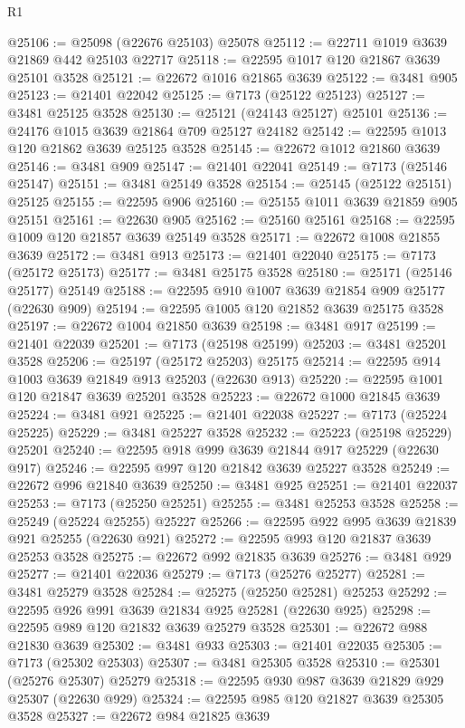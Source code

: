 \begin{lexlean}{R1}
\begin{coremodule}
@25106 := @25098 (@22676 @25103) @25078
@25112 := @22711 @1019 @3639 @21869 @442 @25103 @22717
@25118 := @22595 @1017 @120 @21867 @3639 @25101 @3528
@25121 := @22672 @1016 @21865 @3639
@25122 := @3481 @905
@25123 := @21401 @22042
@25125 := @7173 (@25122 @25123)
@25127 := @3481 @25125 @3528
@25130 := @25121 (@24143 @25127) @25101
@25136 := @24176 @1015 @3639 @21864 @709 @25127 @24182
@25142 := @22595 @1013 @120 @21862 @3639 @25125 @3528
@25145 := @22672 @1012 @21860 @3639
@25146 := @3481 @909
@25147 := @21401 @22041
@25149 := @7173 (@25146 @25147)
@25151 := @3481 @25149 @3528
@25154 := @25145 (@25122 @25151) @25125
@25155 := @22595 @906
@25160 := @25155 @1011 @3639 @21859 @905 @25151
@25161 := @22630 @905
@25162 := @25160 @25161
@25168 := @22595 @1009 @120 @21857 @3639 @25149 @3528
@25171 := @22672 @1008 @21855 @3639
@25172 := @3481 @913
@25173 := @21401 @22040
@25175 := @7173 (@25172 @25173)
@25177 := @3481 @25175 @3528
@25180 := @25171 (@25146 @25177) @25149
@25188 := @22595 @910 @1007 @3639 @21854 @909 @25177 (@22630 @909)
@25194 := @22595 @1005 @120 @21852 @3639 @25175 @3528
@25197 := @22672 @1004 @21850 @3639
@25198 := @3481 @917
@25199 := @21401 @22039
@25201 := @7173 (@25198 @25199)
@25203 := @3481 @25201 @3528
@25206 := @25197 (@25172 @25203) @25175
@25214 := @22595 @914 @1003 @3639 @21849 @913 @25203 (@22630 @913)
@25220 := @22595 @1001 @120 @21847 @3639 @25201 @3528
@25223 := @22672 @1000 @21845 @3639
@25224 := @3481 @921
@25225 := @21401 @22038
@25227 := @7173 (@25224 @25225)
@25229 := @3481 @25227 @3528
@25232 := @25223 (@25198 @25229) @25201
@25240 := @22595 @918 @999 @3639 @21844 @917 @25229 (@22630 @917)
@25246 := @22595 @997 @120 @21842 @3639 @25227 @3528
@25249 := @22672 @996 @21840 @3639
@25250 := @3481 @925
@25251 := @21401 @22037
@25253 := @7173 (@25250 @25251)
@25255 := @3481 @25253 @3528
@25258 := @25249 (@25224 @25255) @25227
@25266 := @22595 @922 @995 @3639 @21839 @921 @25255 (@22630 @921)
@25272 := @22595 @993 @120 @21837 @3639 @25253 @3528
@25275 := @22672 @992 @21835 @3639
@25276 := @3481 @929
@25277 := @21401 @22036
@25279 := @7173 (@25276 @25277)
@25281 := @3481 @25279 @3528
@25284 := @25275 (@25250 @25281) @25253
@25292 := @22595 @926 @991 @3639 @21834 @925 @25281 (@22630 @925)
@25298 := @22595 @989 @120 @21832 @3639 @25279 @3528
@25301 := @22672 @988 @21830 @3639
@25302 := @3481 @933
@25303 := @21401 @22035
@25305 := @7173 (@25302 @25303)
@25307 := @3481 @25305 @3528
@25310 := @25301 (@25276 @25307) @25279
@25318 := @22595 @930 @987 @3639 @21829 @929 @25307 (@22630 @929)
@25324 := @22595 @985 @120 @21827 @3639 @25305 @3528
@25327 := @22672 @984 @21825 @3639

\end{coremodule}
\end{lexlean}
